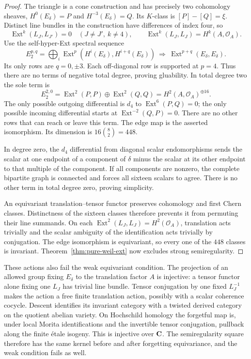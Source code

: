 \begin{proof}
The triangle is a cone construction and has precisely two cohomology sheaves, $H^0(E_\delta)=P$ and $H^{-3}(E_\delta)=Q$. Its $K$-class is $[P]-[Q]=\xi$. Distinct line bundles in the construction have differences of index four, so
\[
 \operatorname{Ext}^k(L_J,L_{J'})=0\quad(J\ne J',\ k\ne4),
 \qquad\operatorname{Ext}^k(L_J,L_J)=H^k(A,\mathcal O_A).
\]
Use the self-hyper-Ext spectral sequence
\[
 E_2^{p,q}=\bigoplus_i
 \operatorname{Ext}^p(H^i(E_\delta),H^{i+q}(E_\delta))
 \ \Longrightarrow\ \operatorname{Ext}^{p+q}(E_\delta,E_\delta).
\]
Its only rows are $q=0,\pm3$. Each off-diagonal row is supported at $p=4$. Thus there are no terms of negative total degree, proving gluability. In total degree two the sole term is
\[
 E_2^{2,0}=\operatorname{Ext}^2(P,P)\oplus\operatorname{Ext}^2(Q,Q)
       =H^2(A,\mathcal O_A)^{\oplus16}.
\]
The only possible outgoing differential is $d_4$ to $\operatorname{Ext}^6(P,Q)=0$; the only possible incoming differential starts at $\operatorname{Ext}^{-2}(Q,P)=0$. There are no other rows that can reach or leave this term. The edge map is the asserted isomorphism. Its dimension is $16\binom82=448$.

In degree zero, the $d_4$ differential from diagonal scalar endomorphisms sends the scalar at one endpoint of a component of $\delta$ minus the scalar at its other endpoint to that multiple of the component. If all components are nonzero, the complete bipartite graph is connected and forces all sixteen scalars to agree. There is no other term in total degree zero, proving simplicity.

An equivariant translation--tensor functor preserves cohomology and first Chern classes. Distinctness of the sixteen classes therefore prevents it from permuting their line summands. On each $\operatorname{Ext}^2(L_J,L_J)=H^2(\mathcal O_A)$, translation acts trivially and the scalar ambiguity of the identification acts trivially by conjugation. The edge isomorphism is equivariant, so every one of the $448$ classes is invariant. Theorem~\ref{thm:pure-weil-ext} now excludes strong semiregularity.
\end{proof}

These actions also fail the weak equivariant condition. The projection of an allowed group fixing $E_\delta$ to the translation factor $A$ is injective: a tensor functor alone fixing one $L_J$ has trivial line bundle. Tensor conjugation by one fixed $L_J^{-1}$ makes the action a free finite translation action, possibly with a scalar coherence cocycle. Descent identifies its invariant category with a twisted derived category on the quotient abelian variety. On Hochschild homology the forgetful map is, under local Morita identifications and the invertible tensor conjugation, pullback along the finite \'etale isogeny. This is injective over $\mathbf C$. The semiregularity square therefore has the same kernel before and after forgetting equivariance, and the weak condition fails as well.

